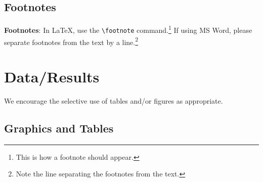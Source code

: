 \documentclass[10pt]{article}
\begin{document}
%
%
%
%

\subsection{Footnotes}

{\bf Footnotes}: In \LaTeX, use the \verb+\footnote+ 
command.\footnote{This is how a footnote should appear.} If using
MS Word, please separate footnotes
from the text by a line.\footnote{Note the line
separating the footnotes from the text.}

\section{Data/Results}

We encourage the selective use of tables and/or figures as appropriate.

\subsection{Graphics and Tables}
\end{document}
